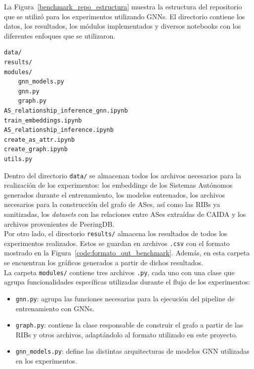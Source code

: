 La Figura~\ref{benchmark_repo_estructura} muestra la estructura del repositorio que se utilizó para los experimentos utilizando GNNs. El directorio contiene los datos, los resultados, los módulos implementados y diversos notebooks con los diferentes enfoques que se utilizaron.\\

{
    \renewcommand{\lstlistingname}{Formato}
\begin{lstlisting}[basicstyle=\ttfamily, label=benchmark_repo_estructura, frame=single, caption=Estructura del repositorio de los experimentos para la tarea de inferencia usando GNNs.]
data/
results/
modules/
    gnn_models.py
    gnn.py
    graph.py
AS_relationship_inference_gnn.ipynb
train_embeddings.ipynb
AS_relationship_inference.ipynb
create_as_attr.ipynb
create_graph.ipynb
utils.py
\end{lstlisting}
}

Dentro del directorio \texttt{data/} se almacenan todos los archivos necesarios para la realización de los experimentos: los embeddings de los Sistemas Autónomos generados durante el entrenamiento, los modelos entrenados, los archivos necesarios para la construcción del grafo de ASes, así como las RIBs ya sanitizadas, los \textit{datasets} con las relaciones entre ASes extraídas de CAIDA y los archivos provenientes de PeeringDB.\\

Por otro lado, el directorio \texttt{results/} almacena los resultados de todos los experimentos realizados. Estos se guardan en archivos \texttt{.csv} con el formato mostrado en la Figura~\ref{code:formato_out_benchmark}. Además, en esta carpeta se encuentran los gráficos generados a partir de dichos resultados.\\


La carpeta \texttt{modules/} contiene tres archivos \texttt{.py}, cada uno con una clase que agrupa funcionalidades específicas utilizadas durante el flujo de los experimentos:
\begin{itemize}
    \item \texttt{gnn.py}: agrupa las funciones necesarias para la ejecución del pipeline de entrenamiento con GNNs.
    \item \texttt{graph.py}: contiene la clase responsable de construir el grafo a partir de las RIBs y otros archivos, adaptándolo al formato utilizado en este proyecto.
    \item \texttt{gnn\_models.py}: define las distintas arquitecturas de modelos GNN utilizadas en los experimentos.
\end{itemize}



